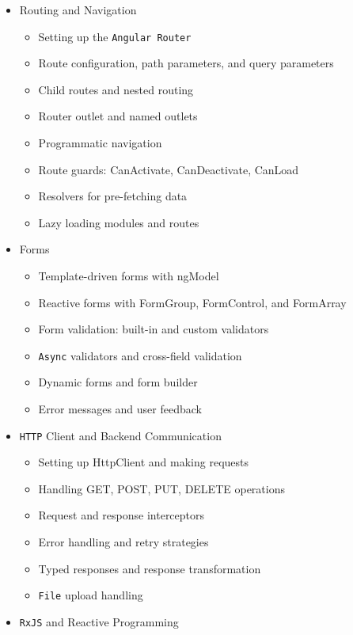 \documentclass[
]{article}
\providecommand{\tightlist}{%
  \setlength{\itemsep}{0pt}\setlength{\parskip}{0pt}}
\begin{document}
\begin{itemize}
  \begin{itemize}
  \tightlist
  \item
    NgModules and their role in Angular
  \item
    Feature modules and shared modules
  \item
    Standalone components vs module-based architecture
  \item
    Organizing a large-scale Angular application
  \end{itemize}
\item
  Routing and Navigation

  \begin{itemize}
  \tightlist
  \item
    Setting up the \texttt{Angular\ Router}
  \item
    Route configuration, path parameters, and query parameters
  \item
    Child routes and nested routing
  \item
    Router outlet and named outlets
  \item
    Programmatic navigation
  \item
    Route guards: CanActivate, CanDeactivate, CanLoad
  \item
    Resolvers for pre-fetching data
  \item
    Lazy loading modules and routes
  \end{itemize}
\item
  Forms

  \begin{itemize}
  \tightlist
  \item
    Template-driven forms with ngModel
  \item
    Reactive forms with FormGroup, FormControl, and FormArray
  \item
    Form validation: built-in and custom validators
  \item
    \texttt{Async} validators and cross-field validation
  \item
    Dynamic forms and form builder
  \item
    Error messages and user feedback
  \end{itemize}
\item
  \texttt{HTTP} Client and Backend Communication

  \begin{itemize}
  \tightlist
  \item
    Setting up HttpClient and making requests
  \item
    Handling GET, POST, PUT, DELETE operations
  \item
    Request and response interceptors
  \item
    Error handling and retry strategies
  \item
    Typed responses and response transformation
  \item
    \texttt{File} upload handling
  \end{itemize}
\item
  \texttt{RxJS} and Reactive Programming


\end{itemize}
\end{document}
